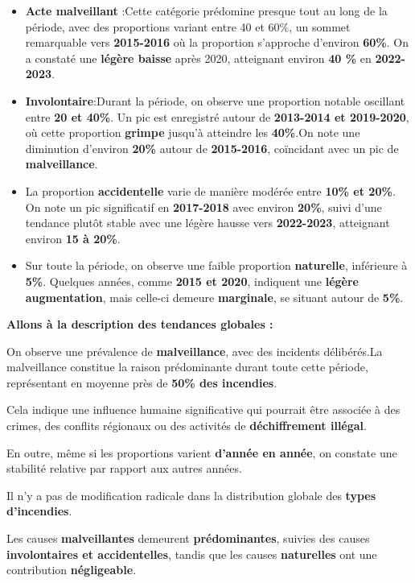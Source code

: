 \documentclass[
]{article}
\begin{document}
\begin{itemize}
\item
  \textbf{Acte malveillant} :Cette catégorie prédomine presque tout au
  long de la période, avec des proportions variant entre 40 et 60\%, un
  sommet remarquable vers \textbf{2015-2016} où la proportion s'approche
  d'environ \textbf{60\%}. On a constaté une \textbf{légère baisse}
  après 2020, atteignant environ \textbf{40 \%} en \textbf{2022-2023}.
\item
  \textbf{Involontaire}:Durant la période, on observe une proportion
  notable oscillant entre \textbf{20 et 40\%}. Un pic est enregistré
  autour de \textbf{2013-2014 et 2019-2020}, où cette proportion
  \textbf{grimpe} jusqu'à atteindre les \textbf{40\%}.On note une
  diminution d'environ \textbf{20\%} autour de \textbf{2015-2016},
  coïncidant avec un pic de \textbf{malveillance}.
\item
  La proportion \textbf{accidentelle} varie de manière modérée entre
  \textbf{10\% et 20\%}. On note un pic significatif en
  \textbf{2017-2018} avec environ \textbf{20\%}, suivi d'une tendance
  plutôt stable avec une légère hausse vers \textbf{2022-2023},
  atteignant environ \textbf{15 à 20\%}.
\item
  Sur toute la période, on observe une faible proportion
  \textbf{naturelle}, inférieure à \textbf{5\%}. Quelques années, comme
  \textbf{2015 et 2020}, indiquent une \textbf{légère augmentation},
  mais celle-ci demeure \textbf{marginale}, se situant autour de
  \textbf{5\%}.
\end{itemize}

\textbf{Allons à la description des tendances globales :}

On observe une prévalence de \textbf{malveillance}, avec des incidents
délibérés.La malveillance constitue la raison prédominante durant toute
cette période, représentant en moyenne près de \textbf{50\% des
incendies}.

Cela indique une influence humaine significative qui pourrait être
associée à des crimes, des conflits régionaux ou des activités de
\textbf{déchiffrement illégal}.

En outre, même si les proportions varient \textbf{d'année en année}, on
constate une stabilité relative par rapport aux autres années.

Il n'y a pas de modification radicale dans la distribution globale des
\textbf{types d'incendies}.

Les causes \textbf{malveillantes} demeurent \textbf{prédominantes},
suivies des causes \textbf{involontaires et accidentelles}, tandis que
les causes \textbf{naturelles} ont une contribution
\textbf{négligeable}.
\end{document}
